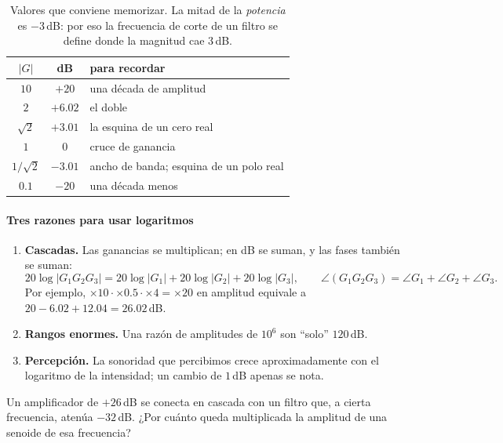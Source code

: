\begin{table}[ht]
\centering\small
\begin{tabular}{@{}cc l@{}}
\toprule
$|G|$ & dB & para recordar\\
\midrule
$10$ & $+20$ & una década de amplitud\\
$2$ & $+6.02$ & el doble\\
$\sqrt2$ & $+3.01$ & la esquina de un cero real\\
$1$ & $0$ & cruce de ganancia\\
$1/\sqrt2$ & $-3.01$ & ancho de banda; esquina de un polo real\\
$0.1$ & $-20$ & una década menos\\
\bottomrule
\end{tabular}
\caption{Valores que conviene memorizar. La mitad de la \emph{potencia} es $-3$\,dB: por eso la frecuencia de corte de un filtro se define donde la magnitud cae $3$\,dB.}
\label{tab:rf-db}
\end{table}

\paragraph{Tres razones para usar logaritmos}
\begin{enumerate}
  \item \textbf{Cascadas.} Las ganancias se multiplican; en dB se suman, y las fases también se suman:
  \[
    20\log|G_1G_2G_3|=20\log|G_1|+20\log|G_2|+20\log|G_3|,\qquad
    \angle(G_1G_2G_3)=\angle G_1+\angle G_2+\angle G_3 .
  \]
  Por ejemplo, $\times10\cdot\times0.5\cdot\times4=\times20$ en amplitud equivale a $20-6.02+12.04=26.02$\,dB.
  \item \textbf{Rangos enormes.} Una razón de amplitudes de $10^6$ son ``solo'' $120$\,dB.
  \item \textbf{Percepción.} La sonoridad que percibimos crece aproximadamente con el logaritmo de la intensidad; un cambio de $1$\,dB apenas se nota.
\end{enumerate}


\begin{pausa}
Un amplificador de $+26$\,dB se conecta en cascada con un filtro que, a cierta frecuencia, atenúa $-32$\,dB. ¿Por cuánto queda multiplicada la amplitud de una senoide de esa frecuencia?
\end{pausa}
